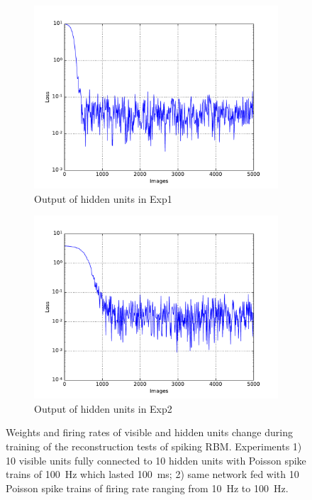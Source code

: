 \begin{figure}
\begin{subfigure}[t]{0.4\textwidth}
		\includegraphics[width=\textwidth]{pics_sdlm/17_exp_SRBM_all_long/exp1_mse_nons.pdf}
		\caption{Output of hidden units in Exp1}
	\end{subfigure}
	\begin{subfigure}[t]{0.4\textwidth}
		\includegraphics[width=\textwidth]{pics_sdlm/17_exp_SRBM_all_long/exp2_mse_nons.pdf}
		\caption{Output of hidden units in Exp2}
	\end{subfigure}
	\caption{Weights and firing rates of visible and hidden units change during training of the reconstruction tests of spiking RBM. 
		Experiments 1) 10 visible units fully connected to 10 hidden units with Poisson spike trains of 100~Hz which lasted 100~ms; 2) same network fed with 10 Poisson spike trains of firing rate ranging from 10~Hz to 100~Hz.}
\end{figure}

